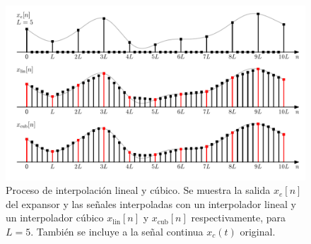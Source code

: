 \documentclass[a4paper]{report}
\begin{document}
\begin{figure}[!htb]
 \begin{center}
 \includegraphics[width=\textwidth]{figuras/sampling_interpolators_interpolation.pdf}
 \caption{\label{fig:sampling_interpolators_interpolation} Proceso de interpolación lineal y cúbico. Se muestra la salida \(x_e[n]\) del expansor y las señales interpoladas con un interpolador lineal y un interpolador cúbico \(x_\textrm{lin}[n]\) y \(x_\textrm{cub}[n]\) respectivamente, para \(L=5\). También se incluye a la señal continua \(x_c(t)\) original.}
 \end{center}
\end{figure}
\end{document}
